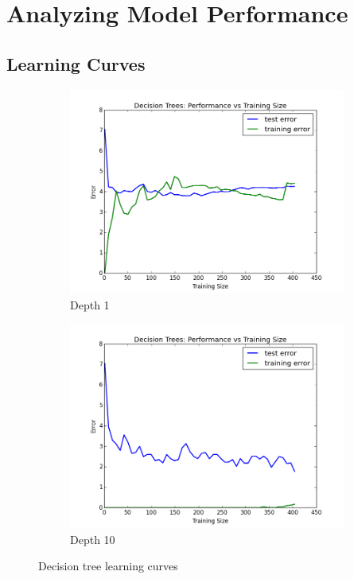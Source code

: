 \documentclass{article}
\begin{document}
	\section{Analyzing Model Performance}
	\subsection{Learning Curves}
	\begin{figure}[h]
		\centering
		\begin{subfigure}[b]{0.4\textwidth}
			\includegraphics[width=\textwidth]{decision_tree_error_graph_depth_1}
			\caption{Depth 1}
			\label{fig:decisionTreeDepth1}
		\end{subfigure}
		\begin{subfigure}[b]{0.4\textwidth}
			\includegraphics[width=\textwidth]{decision_tree_error_graph_depth_10}
			\caption{Depth 10}
			\label{fig:decisionTreeDepth10}
		\end{subfigure}
		\caption{Decision tree learning curves}
	\end{figure}
\end{document}
